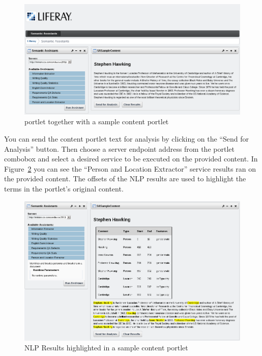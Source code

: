 \begin{figure}
\centering
\includegraphics[scale=0.6]{pictures/liferay_both_portlets.png}
\caption{\sa portlet together with a sample content portlet}
\label{fig:liferay_both_portlets}
\end{figure}

You can send the content portlet text for analysis by clicking on the ``Send for Analysis'' button. Then choose a server endpoint address from the \sa portlet combobox and select a desired service to be executed on the provided content. In Figure~\ref{fig:liferay_results_portlet} you can see the ``Person and Location Extractor'' service results ran on the provided content. The offsets of the NLP results are used to highlight the terms in the portlet's original content.


\begin{figure}
\centering
\includegraphics[scale=0.6]{pictures/liferay_results_portlet.png}
\caption{NLP Results highlighted in a sample content portlet}
\label{fig:liferay_results_portlet}
\end{figure}